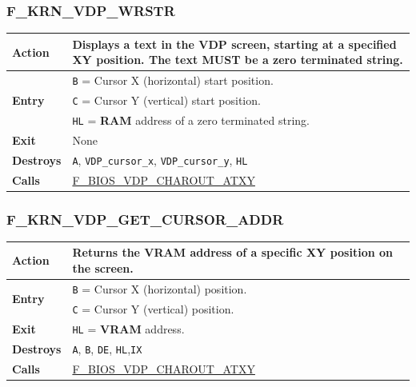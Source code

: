 \documentclass[a4paper,11pt]{article}
\begin{document}
        \subsubsection{F\_KRN\_VDP\_WRSTR}
        \label{func:fkrnvdpwrstr}
        \begin{tabular}{l p{9cm}}
            \hline\textbf{Action}
            & Displays a text in the VDP screen, starting at a specified XY
            position. The text MUST be a zero terminated string. \\
            \hline\multirow[t]{3}{4em}{\textbf{Entry}}
            & \texttt{B} = Cursor X (horizontal) start position.\\
            & \texttt{C} = Cursor Y (vertical) start position.\\
            & \texttt{HL} = \textbf{RAM} address of a zero terminated string.\\
            \hline\textbf{Exit} & None\\
            \hline\textbf{Destroys} & \texttt{A}, \texttt{VDP\_cursor\_x},
                \texttt{VDP\_cursor\_y}, \texttt{HL} \\
            \hline\textbf{Calls} & 
            \hyperref[func:fbiosvdpcharoutatxy]{F\_BIOS\_VDP\_CHAROUT\_ATXY}\\
            \hline
        \end{tabular}

        \subsubsection{F\_KRN\_VDP\_GET\_CURSOR\_ADDR}
        \label{func:fkrnvdpgetcursoraddr}
        \begin{tabular}{l p{9cm}}
            \hline\textbf{Action}
            & Returns the \textbf{VRAM} address of a specific XY position on the
            screen. \\
            \hline\multirow[t]{2}{4em}{\textbf{Entry}}
            & \texttt{B} = Cursor X (horizontal) position.\\
            & \texttt{C} = Cursor Y (vertical) position.\\
            \hline\textbf{Exit} & \texttt{HL} = \textbf{VRAM} address.\\
            \hline\textbf{Destroys} & \texttt{A}, \texttt{B}, \texttt{DE},
                \texttt{HL},\texttt{IX} \\
            \hline\textbf{Calls} & 
            \hyperref[func:fbiosvdpcharoutatxy]{F\_BIOS\_VDP\_CHAROUT\_ATXY}\\
            \hline
        \end{tabular}
\end{document}
